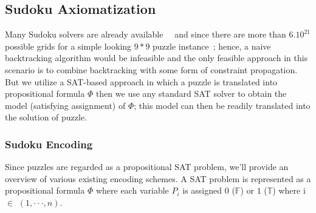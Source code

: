 \documentclass[letterpaper]{article}
\begin{document}
\subsection{Sudoku Axiomatization}
Many Sudoku solvers are already available~\cite{Pete2005}~\cite{DeadMan2005} and since there are more than $6.10^{21}$ possible grids for a simple looking $9\ast9$ puzzle instance~\cite{Bertram2005}; hence, a naive backtracking algorithm would be infeasible and the only feasible approach in this scenario is to combine backtracking with some form of constraint propagation. But we utilize a SAT-based approach in which a puzzle is translated into propositional formula $\Phi$ then we use any standard SAT solver to obtain the model (satisfying assignment) of $\Phi$; this model can then be readily translated into the solution of puzzle.

\subsubsection{Sudoku Encoding}
Since puzzles are regarded as a propositional SAT problem, we'll provide an overview of various existing encoding schemes. A SAT problem is represented as a propositional formula  $\Phi$ where each variable $P_i$ is assigned $0$ ($\mathbb{F}$) or $1$ ($\mathbb{T}$) where i $\in$ $(1,\cdot\cdot\cdot,n)$. %
\end{document}
